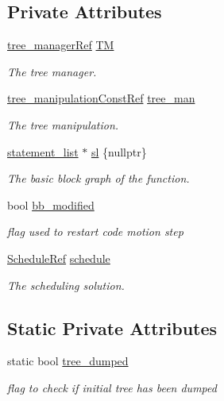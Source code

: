 \subsection*{Private Attributes}
\begin{DoxyCompactItemize}
\item 
\hyperlink{tree__manager_8hpp_a96ff150c071ce11a9a7a1e40590f205e}{tree\+\_\+manager\+Ref} \hyperlink{classPhiOpt_ac2182460316bcd03e5e773a93cb187e5}{TM}
\begin{DoxyCompactList}\small\item\em The tree manager. \end{DoxyCompactList}\item 
\hyperlink{tree__manipulation_8hpp_af8a30f3f306569d7681c1b5af9ddd9d0}{tree\+\_\+manipulation\+Const\+Ref} \hyperlink{classPhiOpt_a67681ee459d9b87db295f45996b750ff}{tree\+\_\+man}
\begin{DoxyCompactList}\small\item\em The tree manipulation. \end{DoxyCompactList}\item 
\hyperlink{structstatement__list}{statement\+\_\+list} $\ast$ \hyperlink{classPhiOpt_a6a4406457378eb931a2760352c11c014}{sl} \{nullptr\}
\begin{DoxyCompactList}\small\item\em The basic block graph of the function. \end{DoxyCompactList}\item 
bool \hyperlink{classPhiOpt_a6c89ff366752e9be3bf875cc93ef60d3}{bb\+\_\+modified}
\begin{DoxyCompactList}\small\item\em flag used to restart code motion step \end{DoxyCompactList}\item 
\hyperlink{schedule_8hpp_af67f402958b3b52a1ec5cc4ce08ae3b9}{Schedule\+Ref} \hyperlink{classPhiOpt_a4cbcc0b8ed5df57d64d71cd9a957a55a}{schedule}
\begin{DoxyCompactList}\small\item\em The scheduling solution. \end{DoxyCompactList}\end{DoxyCompactItemize}
\subsection*{Static Private Attributes}
\begin{DoxyCompactItemize}
\item 
static bool \hyperlink{classPhiOpt_a7515aee0b8a57b866c4d1dacb982a5ea}{tree\+\_\+dumped}
\begin{DoxyCompactList}\small\item\em flag to check if initial tree has been dumped \end{DoxyCompactList}\end{DoxyCompactItemize}
